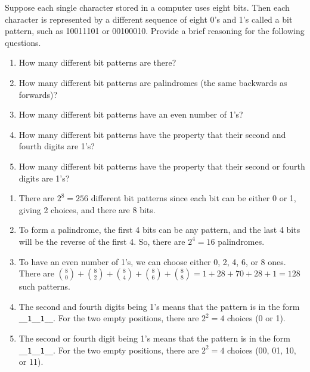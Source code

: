 \documentclass{article}
\theoremstyle{definition}
\begin{document}
\begin{question}
    Suppose each single character stored in a computer uses eight bits. 
    Then each character is represented by a different sequence of eight 0's and 1's called a bit pattern, 
    such as 10011101 or 00100010. Provide a brief reasoning for the following questions.
        \begin{enumerate}
            \item How many different bit patterns are there?
            \item How many different bit patterns are palindromes (the same backwards as forwards)?
            \item How many different bit patterns have an even number of 1's?
            \item How many different bit patterns have the property that their second and fourth digits are 1's?
            \item How many different bit patterns have the property that their second or fourth digits are 1's?
        \end{enumerate}
\end{question}
\begin{solution}
    \begin{enumerate}
        \item There are $2^8 = 256$ different bit patterns since each bit can be either 0 or 1, giving 2 choices, and there are 8 bits.
        \item To form a palindrome, the first 4 bits can be any pattern, and the last 4 bits will be the reverse of the first 4. So, there are $2^4 = 16$ palindromes.
        \item To have an even number of 1's, we can choose either 0, 2, 4, 6, or 8 ones. There are $\binom{8}{0} + \binom{8}{2} + \binom{8}{4} + \binom{8}{6} + \binom{8}{8} = 1 + 28 + 70 + 28 + 1 = 128$ such patterns.
        \item The second and fourth digits being 1's means that the pattern is in the form \texttt{\_\_1\_\_1\_\_}. For the two empty positions, there are $2^2 = 4$ choices (0 or 1).
        \item The second or fourth digit being 1's means that the pattern is in the form \texttt{\_\_1\_\_1\_\_}. For the two empty positions, there are $2^2 = 4$ choices (00, 01, 10, or 11).
    \end{enumerate}
\end{solution}
\end{document}
